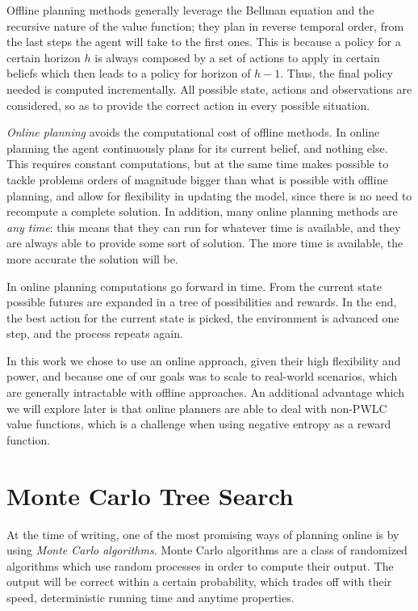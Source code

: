 Offline planning methods generally leverage the Bellman equation and the recursive nature of the
value function; they plan in reverse temporal order, from the last steps the agent will take to the
first ones. This is because a policy for a certain horizon $h$ is always composed by a set of
actions to apply in certain beliefs which then leads to a policy for horizon of $h-1$. Thus, the
final policy needed is computed incrementally. All possible state, actions and observations are
considered, so as to provide the correct action in every possible situation.

\textit{Online planning} avoids the computational cost of offline methods. In online planning the
agent continuously plans for its current belief, and nothing else. This requires constant
computations, but at the same time makes possible to tackle problems orders of magnitude bigger than
what is possible with offline planning, and allow for flexibility in updating the model, since there
is no need to recompute a complete solution. In addition, many online planning methods are
\textit{any time}: this means that they can run for whatever time is available, and they are always
able to provide some sort of solution. The more time is available, the more accurate the solution
will be.

In online planning computations go forward in time. From the current state possible futures are
expanded in a tree of possibilities and rewards. In the end, the best action for the current state
is picked, the environment is advanced one step, and the process repeats again.

In this work we chose to use an online approach, given their high flexibility and power, and because
one of our goals was to scale to real-world scenarios, which are generally intractable with offline
approaches. An additional advantage which we will explore later is that online planners are able to
deal with non-PWLC value functions, which is a challenge when using negative entropy as a reward
function.

\section{Monte Carlo Tree Search}

At the time of writing, one of the most promising ways of planning online is by using \textit{Monte
Carlo algorithms}. Monte Carlo algorithms are a class of randomized algorithms which use random
processes in order to compute their output. The output will be correct within a certain probability,
which trades off with their speed, deterministic running time and anytime properties.


